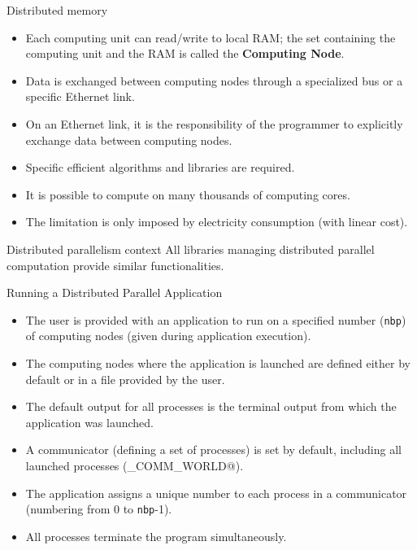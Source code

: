 \documentclass[compress,10pt,aspectratio=169]{beamer}
\begin{document}
\begin{frame}[fragile]{Distributed memory}
    \begin{itemize}
        \item Each computing unit can read/write to local RAM; the set containing the computing unit and the RAM is called the \textbf{Computing Node}.
        \item Data is exchanged between computing nodes through a specialized bus or a specific Ethernet link.
        \item On an Ethernet link, it is the responsibility of the programmer to explicitly exchange data between computing nodes.
        \item Specific efficient algorithms and libraries are required.
        \item It is possible to compute on many thousands of computing cores.
        \item The limitation is only imposed by electricity consumption (with linear cost).
    \end{itemize}    
    \end{frame}

\begin{frame}[fragile]{Distributed parallelism context}
    \small
    All libraries managing distributed parallel computation provide similar functionalities.

\begin{block}{\small Running a Distributed Parallel Application}
    \begin{itemize}
        \scriptsize
        \item The user is provided with an application to run on a specified number (\texttt{nbp}) of computing nodes (given during application execution).
        \item The computing nodes where the application is launched are defined either by default or in a file provided by the user.
        \item The default output for all processes is the terminal output from which the application was launched.
        \item A communicator (defining a set of processes) is set by default, including all launched processes (\verb@MPI_COMM_WORLD@).
        \item The application assigns a unique number to each process in a communicator (numbering from 0 to \texttt{nbp}-1).
        \item All processes terminate the program simultaneously.
    \end{itemize}
\end{block}
\end{frame}
\end{document}
